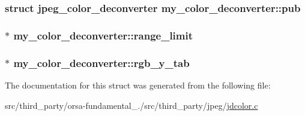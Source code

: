 \subsubsection[{pub}]{\setlength{\rightskip}{0pt plus 5cm}struct {\bf jpeg\+\_\+color\+\_\+deconverter} my\+\_\+color\+\_\+deconverter\+::pub}\label{structmy__color__deconverter_a54bf241de985ca2e06da2bbee14e745a}
\hypertarget{structmy__color__deconverter_a8bae79f8adf764aa32e84a8f40b5b18b}{}
\subsubsection[{range\+\_\+limit}]{$\ast$ my\+\_\+color\+\_\+deconverter\+::range\+\_\+limit}\label{structmy__color__deconverter_a8bae79f8adf764aa32e84a8f40b5b18b}
\hypertarget{structmy__color__deconverter_ad34e0f9d33aaf4b6329e65a95ec8130e}{}
\subsubsection[{rgb\+\_\+y\+\_\+tab}]{$\ast$ my\+\_\+color\+\_\+deconverter\+::rgb\+\_\+y\+\_\+tab}\label{structmy__color__deconverter_ad34e0f9d33aaf4b6329e65a95ec8130e}


The documentation for this struct was generated from the following file\+:\begin{DoxyCompactItemize}
\item 
src/third\+\_\+party/orsa-\/fundamental\+\_./src/third\+\_\+party/jpeg/\hyperlink{jdcolor_8c}{jdcolor.\+c}\end{DoxyCompactItemize}
